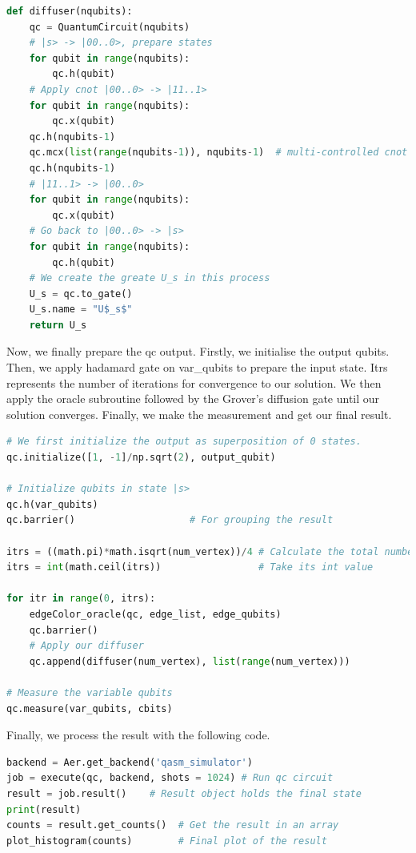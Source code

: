 \documentclass{article}
\begin{document}
\begin{lstlisting}[language=Python]
def diffuser(nqubits):
    qc = QuantumCircuit(nqubits)
    # |s> -> |00..0>, prepare states
    for qubit in range(nqubits):
        qc.h(qubit)
    # Apply cnot |00..0> -> |11..1>
    for qubit in range(nqubits):
        qc.x(qubit)
    qc.h(nqubits-1)
    qc.mcx(list(range(nqubits-1)), nqubits-1)  # multi-controlled cnot
    qc.h(nqubits-1)
    # |11..1> -> |00..0>
    for qubit in range(nqubits):
        qc.x(qubit)
    # Go back to |00..0> -> |s>
    for qubit in range(nqubits):
        qc.h(qubit)
    # We create the greate U_s in this process
    U_s = qc.to_gate()
    U_s.name = "U$_s$"
    return U_s
\end{lstlisting}

Now, we finally prepare the qc output. Firstly, we initialise the output qubits. Then, we apply hadamard gate on var\_qubits to prepare the input state. Itrs represents the number of iterations for convergence to our solution. We then apply the oracle subroutine followed by the Grover's diffusion gate until our solution converges. Finally, we make the measurement and get our final result.

\begin{lstlisting}[language=Python]
# We first initialize the output as superposition of 0 states.
qc.initialize([1, -1]/np.sqrt(2), output_qubit)

# Initialize qubits in state |s>
qc.h(var_qubits)
qc.barrier()                    # For grouping the result

itrs = ((math.pi)*math.isqrt(num_vertex))/4 # Calculate the total number of iterations
itrs = int(math.ceil(itrs))                 # Take its int value

for itr in range(0, itrs):
    edgeColor_oracle(qc, edge_list, edge_qubits)
    qc.barrier() 
    # Apply our diffuser
    qc.append(diffuser(num_vertex), list(range(num_vertex)))

# Measure the variable qubits
qc.measure(var_qubits, cbits)

\end{lstlisting}

Finally, we process the result with the following code. 

\begin{lstlisting}[language=Python]
backend = Aer.get_backend('qasm_simulator') 
job = execute(qc, backend, shots = 1024) # Run qc circuit
result = job.result()    # Result object holds the final state
print(result)
counts = result.get_counts()  # Get the result in an array
plot_histogram(counts)        # Final plot of the result
\end{lstlisting}
\end{document}
